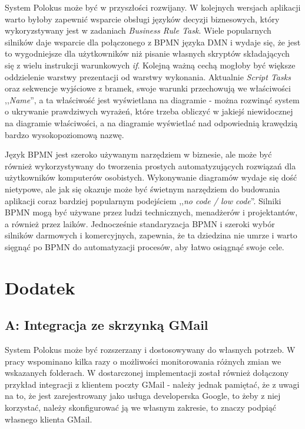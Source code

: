 \documentclass[declaration,shortabstract,mgr]{iithesis}
\newcommand{\bpmn}{BPMN }
\begin{document}
System Polokus może być w przyszłości rozwijany. W kolejnych wersjach aplikacji warto byłoby zapewnić wsparcie obsługi języków decyzji biznesowych, który wykoryzstywany jest w zadaniach \textit{Business Rule Task}. Wiele popularnych silników daje wsparcie dla połączonego z \bpmn języka DMN i wydaje się, że jest to wygodniejsze dla użytkowników niż pisanie własnych skryptów składających się z wielu instrukcji warunkowych \textit{if}. Kolejną ważną cechą mogłoby być większe oddzielenie warstwy prezentacji od warstwy wykonania. Aktualnie \textit{Script Tasks} oraz sekwencje wyjściowe z bramek, swoje warunki przechowują we właściwości ,,\textit{Name}'', a ta właściwość jest wyświetlana na diagramie - można rozwinąć system o ukrywanie prawdziwych wyrażeń, które trzeba obliczyć w jakiejś niewidocznej na diagramie właściwości, a na diagramie wyświetlać nad odpowiednią krawędzią bardzo wysokopoziomową nazwę.

Język \bpmn jest szeroko używanym narzędziem w biznesie, ale może być również wykorzystywany do tworzenia prostych automatyzujących rozwiązań dla użytkowników komputerów osobistych. Wykonywanie diagramów wydaje się dość nietypowe, ale jak się okazuje może być świetnym narzędziem do budowania aplikacji coraz bardziej popularnym podejściem ,,\textit{no code / low code}''. Silniki \bpmn mogą być używane przez ludzi technicznych, menadżerów i projektantów, a również przez laików. Jednocześnie standaryzacja \bpmn i szeroki wybór silników darmowych i komercyjnych, zapewnia, że ta dziedzina nie umrze i warto sięgnąć po \bpmn do automatyzacji procesów, aby łatwo osiągnąć swoje cele.



\appendix
\setcounter{secnumdepth}{-1}
\chapter{Dodatek}
\section*{A: Integracja ze skrzynką GMail}

System Polokus może być rozszerzany i dostosowywany do własnych potrzeb. W pracy wspominano kilka razy o możliwości monitorowania różnych zmian we wskazanych folderach. W dostarczonej implementacji został również dołączony przykład integracji z klientem poczty GMail - należy jednak pamiętać, że z uwagi na to, że jest zarejestrowany jako usługa developerska Google, to żeby z niej korzystać, należy skonfigurować ją we własnym zakresie, to znaczy podpiąć własnego klienta GMail.
\end{document}
